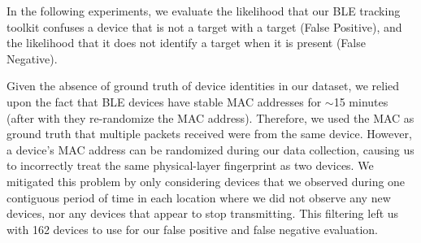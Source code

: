 



In the following experiments, we evaluate %
the likelihood that our BLE tracking toolkit confuses a 
device that is not a target with a target (False Positive), and the likelihood
that it does not identify a target when it is present (False Negative).

Given the absence of ground truth of device identities in our dataset, we
relied upon the fact that BLE devices have stable MAC addresses for $\sim$15
minutes (after with they re-randomize the MAC address). Therefore, we used the
MAC as ground truth that multiple packets received were from the same device.
%
However, a device's MAC address can be randomized 
during our data collection, causing us to incorrectly treat the same
physical-layer fingerprint as two devices. We mitigated this problem by only considering devices that we 
observed during one contiguous period of time in each location where we did not
observe any new devices, nor any devices that appear to stop transmitting.
This filtering left us with 162 devices to use for our false positive and false negative evaluation.

